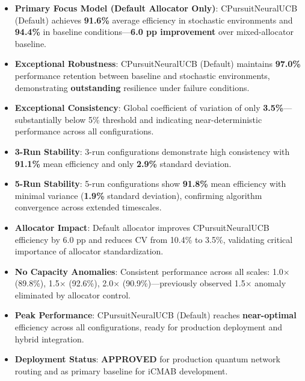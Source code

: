 \documentclass[12pt,a4paper]{article}
\newcommand{\critical}[1]{\textcolor{criticalcolor}{\textbf{#1}}}
\newcommand{\success}[1]{\textcolor{successcolor}{\textbf{#1}}}
\begin{document}
\begin{tcolorbox}[colback=highlightcolor!30,colframe=performancecolor,title=\textbf{Key Experimental Results Summary: CPursuitNeuralUCB (Default Allocator Only, 3-run/5-run, 1$\times$–2$\times$ Capacities, T/Tb Regimes)}]
\begin{itemize}
\item \success{Primary Focus Model (Default Allocator Only)}: CPursuitNeuralUCB (Default) achieves \success{\textbf{91.6\%}} average efficiency in stochastic environments and \success{\textbf{94.4\%}} in baseline conditions—\critical{6.0 pp improvement} over mixed-allocator baseline.

\item \success{Exceptional Robustness}: CPursuitNeuralUCB (Default) maintains \success{\textbf{97.0\%}} performance retention between baseline and stochastic environments, demonstrating \textbf{outstanding} resilience under failure conditions.

\item \success{Exceptional Consistency}: Global coefficient of variation of only \success{\textbf{3.5\%}}—substantially below 5\% threshold and indicating near-deterministic performance across all configurations.

\item \success{3-Run Stability}: 3-run configurations demonstrate high consistency with \success{91.1\%} mean efficiency and only \success{2.9\%} standard deviation.

\item \success{5-Run Stability}: 5-run configurations show \success{91.8\%} mean efficiency with minimal variance (\success{1.9\%} standard deviation), confirming algorithm convergence across extended timescales.

\item \success{Allocator Impact}: Default allocator improves CPursuitNeuralUCB efficiency by 6.0 pp and reduces CV from 10.4\% to 3.5\%, validating critical importance of allocator standardization.

\item \success{No Capacity Anomalies}: Consistent performance across all scales: 1.0$\times$ (89.8\%), 1.5$\times$ (92.6\%), 2.0$\times$ (90.9\%)—previously observed 1.5$\times$ anomaly eliminated by allocator control.

\item \success{Peak Performance}: CPursuitNeuralUCB (Default) reaches \success{\textbf{near-optimal}} efficiency across all configurations, ready for production deployment and hybrid integration.

\item \success{Deployment Status}: \textbf{APPROVED} for production quantum network routing and as primary baseline for iCMAB development.
\end{itemize}
\end{tcolorbox}
\end{document}
